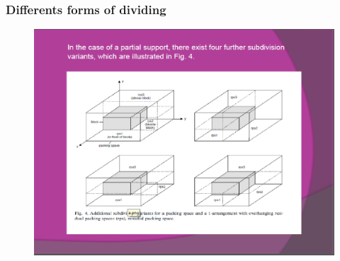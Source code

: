 \documentclass{beamer}
\begin{document}
\begin{frame}
\frametitle{Differents forms of dividing }
\begin{figure}[!th]
\begin{center}
\includegraphics[width=1\textwidth]{img/picn8.eps}
\end{center}
\end{figure}
\end{frame}
\end{document}
